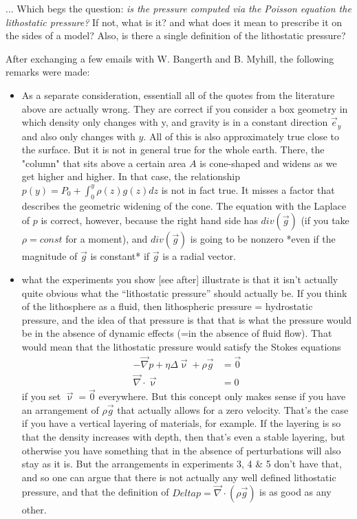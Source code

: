 ... Which begs the question: {\sl is the pressure computed via the Poisson equation the lithostatic pressure?} 
If not, what is it? and what does it mean to prescribe it on the sides of a model? Also, is there a single definition of the lithostatic pressure? 

After exchanging a few emails with W. Bangerth and B. Myhill, the following remarks were made:

\begin{itemize}
\item  As a separate consideration, essentiall all of the quotes from the literature above are actually wrong. 
They are correct if you consider a box geometry in which density only changes with y, and gravity is in a constant 
direction $\vec{e}_y$ and also only changes with $y$. All of this is also approximately true close to the surface.
But it is not in general true for the whole earth. There, the "column" that sits above a certain area $A$ 
is cone-shaped and widens as we get higher and higher. In that case, the relationship
$  p(y) = P_0 + \int_0^y \rho(z) g(z) dz$
is not in fact true. It misses a factor that describes the geometric widening of the cone. 
The equation with the Laplace of $p$ is correct, however, because the right hand side has $div(\vec{g})$
(if you take $\rho=const$ for a moment), and $div(\vec{g})$ is going to be nonzero *even if the magnitude of 
$\vec{g}$ is constant* if $\vec{g}$ is a radial vector.

\item what the experiments you show [see after] illustrate is that it isn't actually quite obvious what 
the ``lithostatic pressure'' should actually be. If you think of the lithosphere as a fluid, 
then lithospheric pressure = hydrostatic pressure, and the idea of that pressure is that that is 
what the pressure would be in the absence of dynamic effects (=in the absence of fluid flow). 
That would mean that the lithostatic pressure would satisfy the Stokes equations
\begin{align}
-\vec\nabla p + \eta \Delta \vec{\upnu} + \rho \vec{g} &= \vec{0} \\
\vec\nabla \cdot \vec{\upnu} &= 0 
\end{align}
if you set $\vec\upnu=\vec{0}$ everywhere. But this concept only makes sense if you have an arrangement 
of $\rho \vec{g}$ that actually allows for a zero velocity. That's the case if you have a vertical layering of 
materials, for example. If the layering is so that the density increases with depth, then that's even 
a stable layering, but otherwise you have something that in the absence of perturbations will also 
stay as it is. But the arrangements in experiments 3, 4 \& 5 don't have that, and so one can argue 
that there is not actually any well defined lithostatic pressure, and that the definition of
$Delta p = \vec\nabla \cdot (\rho \vec{g})$ is as good as any other.


\end{itemize}
